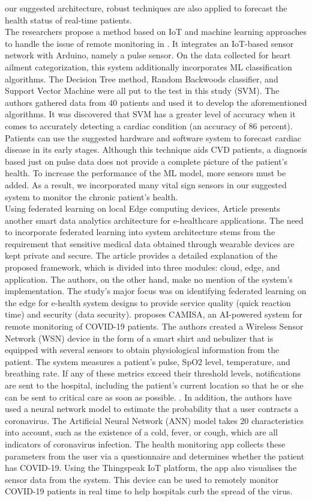 \documentclass{bmcart}
\begin{document}
our suggested architecture, robust techniques are also applied to forecast
the health status of real-time patients.\\
The researchers propose a method based on IoT and machine learning approaches to
handle the issue of remote monitoring in \cite{9167660}. It integrates an
IoT-based sensor network with Arduino, namely a pulse sensor. On the data
collected for heart ailment categorization, this system additionally
incorporates ML classification algorithms. The Decision Tree method, Random
Backwoods classifier, and Support Vector Machine were all put to the test in
this study (SVM). The authors gathered data from 40 patients and used it to
develop the aforementioned algorithms. It was discovered that SVM has a greater
level of accuracy when it comes to accurately detecting a cardiac condition (an
accuracy of 86 percent). Patients can use the suggested hardware and software
system to forecast cardiac disease in its early stages. Although this technique
aids CVD patients, a diagnosis based just on pulse data does not provide a
complete picture of the patient's health. To increase the performance of the ML
model, more sensors must be added. As a result, we incorporated many vital sign
sensors in our suggested system to monitor the chronic patient's health.\\
Using federated learning on local Edge computing devices, Article \cite{9377873}
presents another smart data analytics architecture for e-healthcare
applications. The need to incorporate federated learning into system
architecture stems from the requirement that sensitive medical data obtained through wearable
devices are kept private and secure. The article provides a detailed
explanation of the proposed framework, which is divided into three modules:
cloud, edge, and application. The authors, on the other hand, make no mention of
the system's implementation. The study's major focus was on identifying
federated learning on the edge for e-health system designs to provide
service quality (quick reaction time) and security (data security).\cite{gbha}
proposes CAMISA, an AI-powered system for remote monitoring of COVID-19
patients. The authors created a Wireless Sensor Network (WSN) device in the form
of a smart shirt and nebulizer that is equipped with several sensors to obtain
physiological information from the patient. The system measures a patient's pulse, SpO2 level,
temperature, and breathing rate. If any of these
metrics exceed their threshold levels, notifications are sent to the hospital,
including the patient's current location so that he or she can be sent to
critical care as soon as possible. . In addition, the authors have used a neural
network model to estimate the probability that a user contracts a coronavirus.
The Artificial Neural Network (ANN) model takes 20 characteristics into account,
such as the existence of a cold, fever, or cough, which are all indicators of
coronavirus infection. The health monitoring app collects these parameters from
the user via a questionnaire and determines whether the patient has
COVID-19. Using the Thingspeak IoT platform, the app also visualises the sensor
data from the system. This device can be used to remotely monitor COVID-19
patients in real time to help hospitals curb the spread of the virus.
\end{document}
